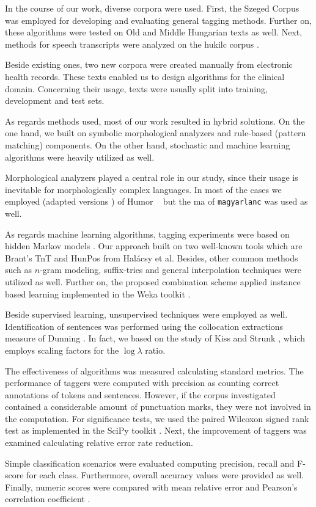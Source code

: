 In the course of our work, diverse corpora were used. 
First, the Szeged Corpus \cite{Csendes2004} was employed for developing and evaluating general tagging methods.
Further on, these algorithms were tested on Old and Middle Hungarian \cite{Novak2013} texts as well.
Next, methods for speech transcripts were analyzed on the \acrshort{hukilc} corpus \cite{Matyus2014}.

Beside existing ones, two new corpora were created manually from electronic health records.
These texts enabled us to design algorithms for the clinical domain.
Concerning their usage, texts were usually split into training, development and test sets.

As regards methods used, most of our work resulted in hybrid solutions.
On the one hand, we built on symbolic morphological analyzers and rule-based (pattern matching) components. 
On the other hand, stochastic and machine learning algorithms were heavily utilized as well.

Morphological analyzers played a central role in our study, since their usage is inevitable for morphologically complex languages.
In most of the cases we employed (adapted versions \cite{Novak2013,NovakOMK,Orosz2013}) of Humor ~\cite{Proszeky1994,Novak2003,Proszeky2005} but the \acrshort{ma} of \texttt{magyarlanc} \cite{zsibrata2013magyarlanc} was used as well.

As regards machine learning algorithms, tagging experiments were based on hidden Markov models \cite{Rabiner1989,Samuelsson1993}. 
Our approach built on two well-known tools which are Brant's TnT \cite{Brants2000} and HunPos \cite{Halacsy2007} from Halácsy et al. 
Besides, other common methods such as $n$-gram modeling, suffix-tries and general interpolation techniques were utilized as well.
Further on, the proposed combination scheme applied instance based learning \cite{Aha1991} implemented in the Weka toolkit \cite{Hall2009}.

Beside supervised learning, unsupervised techniques were employed as well.
Identification of sentences was performed using the collocation extractions measure of Dunning \cite{dunning1993accurate}.
In fact, we based on the study of Kiss and Strunk \cite{kiss2006unsupervised}, which employs scaling factors for the $\log\lambda$ ratio.

The effectiveness of algorithms was measured calculating standard metrics.
The performance of taggers were computed with precision as counting correct annotations of tokens and sentences.
However, if the corpus investigated contained a considerable amount of punctuation marks, they were not involved in the computation.
For significance tests, we used the paired Wilcoxon signed rank test as implemented in the SciPy toolkit \cite{scipy}.
Next, the improvement of taggers was examined calculating relative error rate reduction. 

Simple classification scenarios were evaluated computing precision, recall and F-score for each class.
Furthermore, overall accuracy values were provided as well.
Finally, numeric scores were compared with mean relative error \cite{Witten2011} and Pearson's correlation coefficient \cite{Witten2011}.